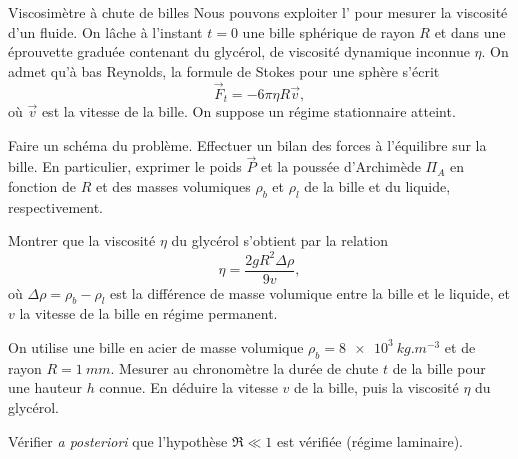 \documentclass[12pt,fancy]{cours}
\begin{document}
	
\begin{experience}{Viscosimètre à chute de billes}
Nous pouvons exploiter l' pour mesurer la viscosité d’un fluide. On lâche à l'instant $t=0$ une bille sphérique de rayon $R$ et dans une éprouvette graduée contenant du glycérol, de viscosité dynamique inconnue $\eta$. On admet qu’à bas Reynolds, la formule de Stokes pour une sphère s’écrit 
\begin{equation}
	\Vec{F}_{\! t} = -6\pi\eta R \Vec{v},
\end{equation}
où $\Vec{v}$ est la vitesse de la bille. On suppose un régime  stationnaire atteint.
\begin{quest}
	\item Faire un schéma du problème. Effectuer un bilan des forces à l’équilibre sur la bille. En particulier, exprimer le poids $\Vec{P}$ et la poussée d’Archimède $\Pi_A$ en fonction de $R$ et des masses volumiques $\rho_b$ et $\rho_l$ de la bille et du liquide, respectivement.
	\item Montrer que la viscosité $\eta$ du glycérol s’obtient par la relation
	\begin{equation}
		\eta = \frac{2 gR^2 \Delta \rho }{9v},
	\end{equation}
	où $\Delta \rho = \rho_b - \rho_l$ est la différence de masse volumique entre la bille et le liquide, et $v$ la vitesse de la bille en régime permanent.
	\item On utilise  une bille en acier de masse volumique $\rho_b = \SI{8e3}{kg.m^{-3}}$ et de rayon $R=\SI{1}{mm}$. Mesurer au chronomètre la durée de chute $t$ de la bille pour une hauteur $h$ connue. En déduire la vitesse $v$ de la bille, puis la viscosité $\eta$ du glycérol.
	\item Vérifier \emph{a posteriori} que l’hypothèse $\Re \ll 1$ est vérifiée (régime laminaire).
\end{quest}
\end{experience}
\end{document}
